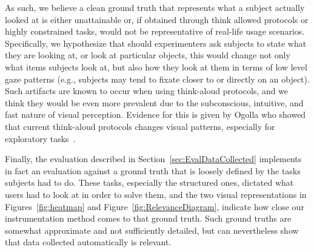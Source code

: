 As such, we believe a clean ground truth that represents what a subject actually looked at is either unattainable or, if obtained through think allowed protocols or highly constrained tasks, would not be representative of real-life usage scenarios. Specifically, we hypothesize that should experimenters ask subjects to state what they are looking at, or look at particular objects, this would change not only what items subjects look at, but also how they look at them in terms of low level gaze patterns (e.g., subjects may tend to fixate closer to or directly on an object). Such artifacts are known to occur when using think-aloud protocols, and we think they would be even more prevalent due to the subconscious, intuitive, and fast nature of visual perception.  Evidence for this is given by Ogolla who showed that current think-aloud protocols changes visual patterns, especially for exploratory tasks~\cite{ogolla2011usability}.
 

Finally, the evaluation described in Section~\ref{sec:EvalDataCollected} implements in fact an evaluation against a ground truth that is loosely defined by the tasks subjects had to do. These tasks, especially the structured ones, dictated what users had to look at in order to solve them, and the two visual representations in Figures~\ref{fig:heatmap} and Figure~\ref{fig:RelevanceDiagram}, indicate how close our instrumentation method comes to that ground truth. Such ground truths are somewhat approximate and not sufficiently detailed, but can nevertheless show that data collected automatically is relevant. 


